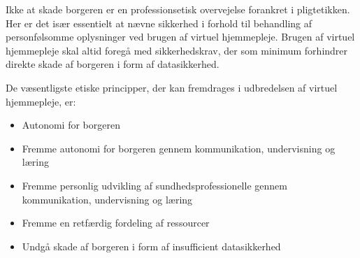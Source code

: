 Ikke at skade borgeren er en professionsetisk overvejelse forankret i pligtetikken\cite{mtv}. Her er det især essentielt at nævne sikkerhed i forhold til behandling af personfølsomme oplysninger ved brugen af virtuel hjemmepleje. Brugen af virtuel hjemmepleje skal altid foregå med sikkerhedskrav, der som minimum forhindrer direkte skade af borgeren i form af datasikkerhed.

De væsentligste etiske principper, der kan fremdrages i udbredelsen af virtuel hjemmepleje, er:

\begin{itemize}
	\item Autonomi for borgeren
	\item Fremme autonomi for borgeren gennem kommunikation, undervisning og læring
	\item Fremme personlig udvikling af sundhedsprofessionelle gennem kommunikation, undervisning og læring
	\item Fremme en retfærdig fordeling af ressourcer 
	\item Undgå skade af borgeren i form af insufficient datasikkerhed
\end{itemize}





